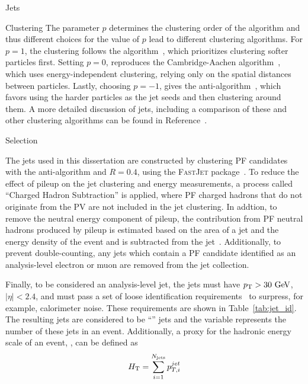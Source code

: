 \begin{section}{Jets}
\begin{subsection}{Clustering}
The parameter $p$ determines the clustering order of the algorithm and thus different choices for the value of $p$ lead to different clustering algorithms.
For $p = 1$, the clustering follows the \kT algorithm~\cite{Ellis:1993tq}, which prioritizes clustering softer particles first.
Setting $p = 0$, reproduces the Cambridge-Aachen algorithm~\cite{Dokshitzer:1997in}, which uses energy-independent clustering, relying only on the spatial distances between particles.
Lastly, choosing $p = -1$, gives the anti-\kT algorithm~\cite{Cacciari:2008gp}, which favors using the harder particles as the jet seeds and then clustering around them.
A more detailed discussion of jets, including a comparison of these and other clustering algorithms can be found in Reference~\cite{Salam:2009jx}.

\end{subsection}

\begin{subsection}{Selection}

The jets used in this dissertation are constructed by clustering PF candidates with the anti-\kT algorithm and $R = 0.4$, using the \textsc{FastJet} package~\cite{Cacciari:2011ma}.
To reduce the effect of pileup on the jet clustering and energy measurements, a process called ``Charged Hadron Subtraction'' is applied, where PF charged hadrons that do not originate from the PV are not included in the jet clustering.
In addtion, to remove the neutral energy component of pileup, the contribution from PF neutral hadrons produced by pileup is estimated based on the area of a jet and the energy density of the event and is subtracted from the jet~\cite{Cacciari:2007fd}.
Additionally, to prevent double-counting, any jets which contain a PF candidate identified as an analysis-level electron or muon are removed from the jet collection. 

Finally, to be considered an analysis-level jet, the jets must have $p_{\mathrm{T}} > 30~\mathrm{Ge\kern -0.1em V}$, $|\eta| < 2.4$, and must pass a set of loose identification requirements~\cite{jet_id,1748-0221-6-11-P11002} to surpress, for example, calorimeter noise.
These requirements are shown in Table~\ref{tab:jet_id}.
The resulting jets are considered to be ``\smallR'' jets  and the variable \Njets represents the number of these jets in an event.
Additionally, a proxy for the hadronic energy scale of an event, \HT, can be defined as
\begin{align}
H_{\mathrm{T}} = \sum_{i = 1}^{N_{\mathrm{jets}}} p_{T,i}^{jet}
\end{align}


\end{subsection}
\end{section}
